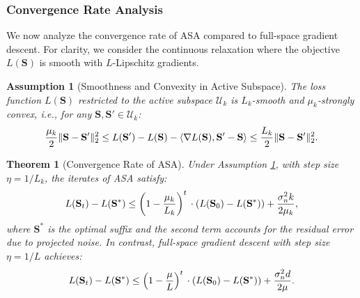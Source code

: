 ﻿\documentclass[lettersize,journal]{IEEEtran}
\newtheorem{theorem}{Theorem}
\newtheorem{assumption}{Assumption}
\begin{document}
\subsubsection{Convergence Rate Analysis}
\label{sec:convergence}

We now analyze the convergence rate of ASA compared to full-space gradient descent. For clarity, we consider the continuous relaxation where the objective $L(\mathbf{S})$ is smooth with $L$-Lipschitz gradients.

\begin{assumption}[Smoothness and Convexity in Active Subspace]
\label{ass:smoothness}
The loss function $L(\mathbf{S})$ restricted to the active subspace $\mathcal{U}_k$ is $L_k$-smooth and $\mu_k$-strongly convex, i.e., for any $\mathbf{S}, \mathbf{S}' \in \mathcal{U}_k$:
\begin{equation}
\frac{\mu_k}{2} \|\mathbf{S} - \mathbf{S}'\|_2^2 \leq L(\mathbf{S}') - L(\mathbf{S}) \\\\
- \langle \nabla L(\mathbf{S}), \mathbf{S}' - \mathbf{S} \rangle \leq \frac{L_k}{2} \|\mathbf{S} - \mathbf{S}'\|_2^2.
\end{equation}
\end{assumption}

\begin{theorem}[Convergence Rate of ASA]
\label{thm:convergence}
Under Assumption \ref{ass:smoothness}, with step size $\eta = 1/L_k$, the iterates of ASA satisfy:
\begin{equation}
L(\mathbf{S}_t) - L(\mathbf{S}^*) \leq \left(1 - \frac{\mu_k}{L_k}\right)^t \\\\
\cdot \left(L(\mathbf{S}_0) - L(\mathbf{S}^*)\right) + \frac{\sigma_n^2 k}{2 \mu_k},
\end{equation}
where $\mathbf{S}^*$ is the optimal suffix and the second term accounts for the residual error due to projected noise. In contrast, full-space gradient descent with step size $\eta = 1/L$ achieves:
\begin{equation}
\label{eq:full_convergence}
L(\mathbf{S}_t) - L(\mathbf{S}^*) \leq \left(1 - \frac{\mu}{L}\right)^t \\\\
\cdot \left(L(\mathbf{S}_0) - L(\mathbf{S}^*)\right) + \frac{\sigma_n^2 d}{2 \mu}.
\end{equation}
\end{theorem}
\end{document}
